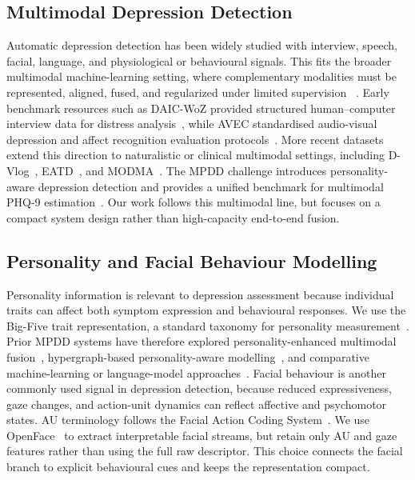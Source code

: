 \documentclass[sigconf,screen,review]{acmart}
\begin{document}
\subsection{Multimodal Depression Detection}
Automatic depression detection has been widely studied with interview, speech,
facial, language, and physiological or behavioural signals. This fits the
broader multimodal machine-learning setting, where complementary modalities must
be represented, aligned, fused, and regularized under limited supervision
~\cite{baltrusaitis2019multimodal}. Early benchmark resources such as DAIC-WoZ
provided structured human--computer interview data for distress
analysis~\cite{gratch2014daic}, while AVEC standardised audio-visual depression
and affect recognition evaluation protocols~\cite{ringeval2019avec}. More
recent datasets extend this direction to naturalistic or clinical multimodal
settings, including D-Vlog~\cite{yoon2022dvlog}, EATD~\cite{shen2022eatd}, and
MODMA~\cite{cai2022modma}. The MPDD challenge introduces personality-aware
depression detection and provides a unified benchmark for multimodal PHQ-9
estimation~\cite{fu2025mpdd}. Our work follows this multimodal line, but
focuses on a compact system design rather than high-capacity end-to-end fusion.

\subsection{Personality and Facial Behaviour Modelling}
Personality information is relevant to depression assessment because individual
traits can affect both symptom expression and behavioural responses. We use the
Big-Five trait representation, a standard taxonomy for personality
measurement~\cite{john1999bigfive}. Prior MPDD systems have therefore explored
personality-enhanced multimodal fusion~\cite{wang2025personality},
hypergraph-based personality-aware modelling~\cite{fu2026p3hf}, and comparative
machine-learning or language-model approaches~\cite{hong2025exploring}. Facial
behaviour is another commonly used signal in depression detection, because
reduced expressiveness, gaze changes, and action-unit dynamics can reflect
affective and psychomotor states. AU terminology follows the Facial Action
Coding System~\cite{ekman1978facs}. We use OpenFace~\cite{baltrusaitis2018openface}
to extract interpretable facial streams, but retain only AU and gaze features
rather than using the full raw descriptor. This choice connects the facial
branch to explicit behavioural cues and keeps the representation compact.
\end{document}

